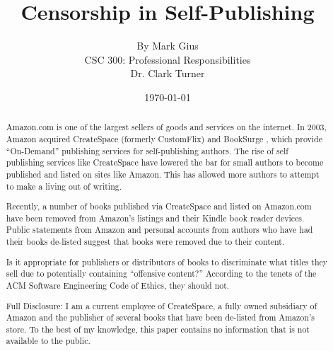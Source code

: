 \documentclass[11pt]{article}
\begin{document}
\title{\vfill Censorship in Self-Publishing} %
\author{
By Mark Gius\vspace{10pt} \\ 
CSC 300: Professional Responsibilities\vspace{10pt} \\ 
Dr. Clark Turner\vspace{10pt} \\ 
}
\date{\today}

\maketitle

\vfill  %
\begin{abstract}
Amazon.com is one of the largest sellers of goods and services on the internet.  In 2003, Amazon acquired CreateSpace (formerly CustomFlix) and BookSurge \cite{CustomFlixAcquisition, BookSurgeAcquisition}, which provide ``On-Demand'' publishing services for self-publishing authors. The rise of self publishing services like CreateSpace have lowered the bar for small authors to become published and listed on sites like Amazon. This has allowed more authors to attempt to make a living out of writing.

Recently, a number of books published via CreateSpace and listed on Amazon.com have been removed from Amazon's listings and their Kindle book reader devices.  Public statements from Amazon and personal accounts from authors who have had their books de-listed suggest that books were removed due to their content. 

Is it appropriate for publishers or distributors of books to discriminate what titles they sell due to potentially containing ``offensive content?''  According to the tenets of the ACM Software Engineering Code of Ethics, they should not. 

\vfill

Full Disclosure: I am a current employee of CreateSpace, a fully owned subsidiary of Amazon and the publisher of several books that have been de-listed from Amazon's store. To the best of my knowledge, this paper contains no information that is not available to the public.
\end{abstract}

\thispagestyle{empty} %
\newpage
\end{document}
